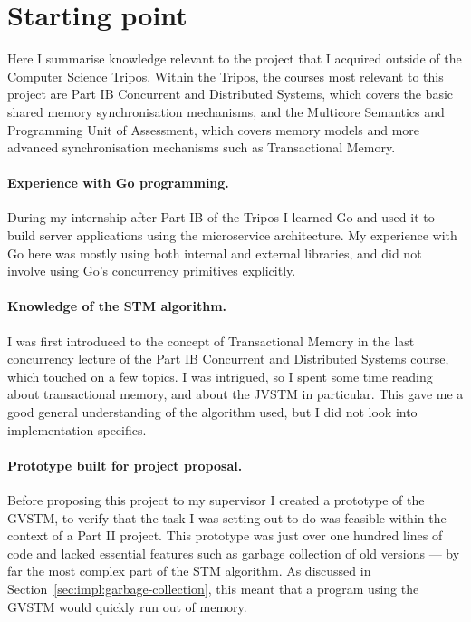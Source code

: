 \documentclass[12pt,a4paper,oneside,openright]{report}
\begin{document}
\section{Starting point}
\label{sec:prep:starting-point}

Here I summarise knowledge relevant to the project that I acquired
outside of the Computer Science Tripos. Within the Tripos, the courses
most relevant to this project are Part IB Concurrent and Distributed
Systems, which covers the basic shared memory synchronisation
mechanisms, and the Multicore Semantics and Programming Unit of
Assessment, which covers memory models and more advanced
synchronisation mechanisms such as Transactional Memory.

\paragraph{Experience with Go programming.} During my internship after
Part IB of the Tripos I learned Go and used it to build server
applications using the microservice architecture. My experience with
Go here was mostly using both internal and external libraries, and did
not involve using Go's concurrency primitives explicitly.

\paragraph{Knowledge of the STM algorithm.} I was first introduced to
the concept of Transactional Memory in the last concurrency lecture of
the Part IB Concurrent and Distributed Systems course, which touched
on a few topics. I was intrigued, so I spent some time reading about
transactional memory, and about the JVSTM in particular. This gave me
a good general understanding of the algorithm used, but I did not look
into implementation specifics.

\paragraph{Prototype built for project proposal.} Before proposing
this project to my supervisor I created a prototype of the GVSTM, to
verify that the task I was setting out to do was feasible within the
context of a Part II project. This prototype was just over one hundred
lines of code and lacked essential features such as garbage collection
of old versions --- by far the most complex part of the STM
algorithm. As discussed in Section~\ref{sec:impl:garbage-collection},
this meant that a program using the GVSTM would quickly run out of
memory.
\end{document}
